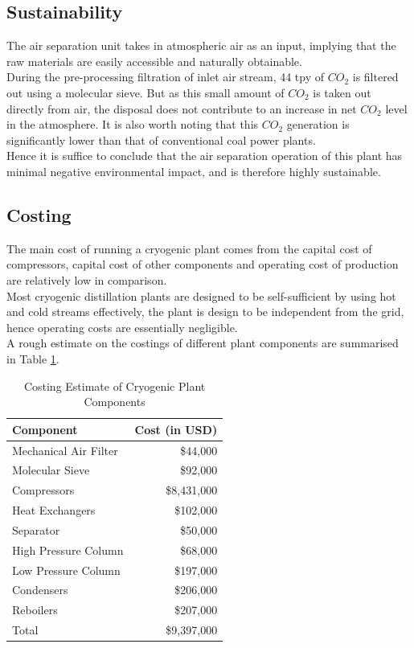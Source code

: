 \subsection{Sustainability}  \noindent
The air separation unit takes in atmospheric air as an input, implying that the raw materials are easily accessible and naturally obtainable. \\
During the pre-processing filtration of inlet air stream, 44 tpy of $CO_2$ is filtered out using a molecular sieve. But as this small amount of $CO_2$ is taken out directly from air, the disposal does not contribute to an increase in net $CO_2$ level in the atmosphere. It is also worth noting that this $CO_2$ generation is significantly lower than that of conventional coal power plants. \\
Hence it is suffice to conclude that the air separation operation of this plant has minimal negative environmental impact, and is therefore highly sustainable.
\subsection{Costing} \noindent
The main cost of running a cryogenic plant comes from the capital cost of compressors, capital cost of other components and operating cost of production are relatively low in comparison. \\
Most cryogenic distillation plants are designed to be self-sufficient by using hot and cold streams effectively, the plant is design to be independent from the grid, hence operating costs are essentially negligible.\\
A rough estimate on the costings of different plant components are summarised in Table \ref{table:cost}.
\begin{table}[H]
    \singlespacing
    \centering
    \caption{Costing Estimate of Cryogenic Plant Components}
    \label{table:cost}
    \begin{tabular}{|l|r|}
        \hline
        Component                               & Cost (in USD)    \\     \hline
        Mechanical Air Filter \citep{matches}   & \$44,000         \\
        Molecular Sieve \citep{couper2012}      & \$92,000         \\
        Compressors \citep{matches}             & \$8,431,000      \\
        Heat Exchangers \citep{douglas1988}     & \$102,000        \\
        Separator \citep{matches}               & \$50,000         \\
        High Pressure Column \citep{douglas1988} & \$68,000         \\
        Low Pressure Column \citep{douglas1988}  & \$197,000        \\
        Condensers \citep{douglas1988}           & \$206,000        \\
        Reboilers \citep{douglas1988}            & \$207,000        \\     \hline
        Total                 & \$9,397,000     \\     \hline
    \end{tabular}
\end{table}
